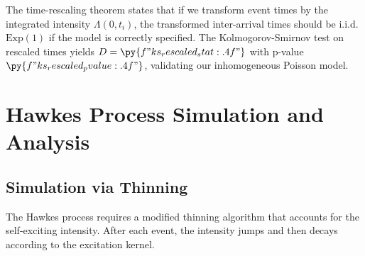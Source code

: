 \documentclass[a4paper, 11pt]{article}
\begin{document}
The time-rescaling theorem states that if we transform event times by the integrated
intensity $\Lambda(0, t_i)$, the transformed inter-arrival times should be i.i.d.\
$\text{Exp}(1)$ if the model is correctly specified. The Kolmogorov-Smirnov test
on rescaled times yields $D = \py{f"{ks_rescaled_stat:.4f}"}$ with p-value
$\py{f"{ks_rescaled_pvalue:.4f}"}$, validating our inhomogeneous Poisson model.

\section{Hawkes Process Simulation and Analysis}

\subsection{Simulation via Thinning}

The Hawkes process requires a modified thinning algorithm that accounts for the
self-exciting intensity. After each event, the intensity jumps and then decays
according to the excitation kernel.
\end{document}
